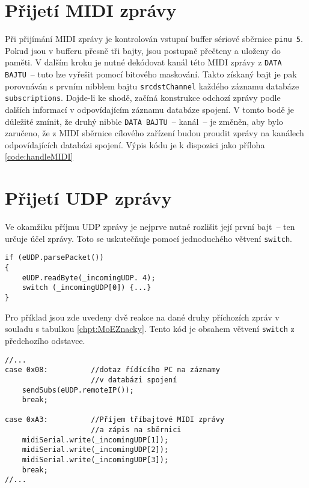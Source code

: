 \section{Přijetí \acs{MIDI} zprávy}\label{chpt:PrijMIDI}
Při přijímání \acs{MIDI} zprávy je kontrolován vstupní buffer sériové sběrnice \texttt{pinu 5}. Pokud jsou v bufferu přesně tři bajty, jsou postupně přečteny a uloženy do paměti. V dalším kroku je nutné dekódovat kanál této \acs{MIDI} zprávy z \texttt{DATA BAJTU}~-- tuto  lze vyřešit pomocí bitového maskování. Takto získaný bajt je pak porovnáván s prvním nibblem bajtu \texttt{srcdstChannel} každého záznamu databáze \texttt{sub\-scrip\-tions}. Dojde-li ke shodě, začíná konstrukce odchozí zprávy podle dalších informací v odpovídajícím záznamu databáze spojení. V tomto bodě je důležité zmínit, že druhý nibble \texttt{DATA BAJTU}~-- kanál~-- je změněn, aby bylo zaručeno, že z \acs{MIDI} sběrnice cílového zařízení budou proudit zprávy na kanálech odpovídajících databázi spojení. Výpis kódu je k dispozici jako příloha \ref{code:handleMIDI}

\section{Přijetí UDP zprávy}
Ve okamžiku příjmu \acs{UDP} zprávy je nejprve nutné rozlišit její první bajt~-- ten určuje účel zprávy. Toto se uskutečňuje pomocí jednoduchého větvení \texttt{switch}.
\begin{lstlisting}
if (eUDP.parsePacket())
{
    eUDP.readByte(_incomingUDP. 4);
    switch (_incomingUDP[0]) {...}
}
\end{lstlisting}

Pro příklad jsou zde uvedeny dvě reakce na dané druhy příchozích zpráv v souladu s tabulkou \ref{chpt:MoEZnacky}. Tento kód je obsahem větvení \texttt{switch} z předchozího odstavce.
\begin{lstlisting}
//...
case 0x08:          //dotaz řídícího PC na záznamy 
                    //v databázi spojení
    sendSubs(eUDP.remoteIP());
    break;

case 0xA3:          //Příjem tříbajtové MIDI zprávy 
                    //a zápis na sběrnici
    midiSerial.write(_incomingUDP[1]);
    midiSerial.write(_incomingUDP[2]);
    midiSerial.write(_incomingUDP[3]);
    break;
//...
\end{lstlisting}
